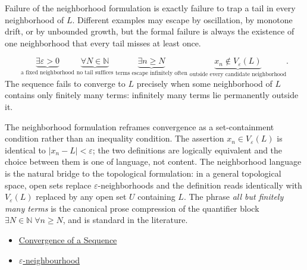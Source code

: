 \begin{remark*}
Failure of the neighborhood formulation is exactly failure to trap a
tail in every neighborhood of $L$. Different examples may escape by
oscillation, by monotone drift, or by unbounded growth, but the formal
failure is always the existence of one neighborhood that every tail
misses at least once.
\end{remark*}

\begin{remark*}
\[
\underbrace{\exists \varepsilon > 0}_{\text{a fixed neighborhood}}
\;\underbrace{\forall N \in \mathbb{N}}_{\text{no tail suffices}}
\;\underbrace{\exists n \ge N}_{\text{terms escape infinitely often}}
\;\underbrace{x_n \notin V_\varepsilon(L)}_{\text{outside every candidate neighborhood}}.
\]
The sequence fails to converge to $L$ precisely when some neighborhood
of $L$ contains only finitely many terms: infinitely many terms lie
permanently outside it.
\end{remark*}

\begin{remark*}[Interpretation]
The neighborhood formulation reframes convergence as a set-containment
condition rather than an inequality condition. The assertion $x_n \in
V_\varepsilon(L)$ is identical to $|x_n - L| < \varepsilon$; the two
definitions are logically equivalent and the choice between them is one
of language, not content. The neighborhood language is the natural
bridge to the topological formulation: in a general topological space,
open sets replace $\varepsilon$-neighborhoods and the definition reads
identically with $V_\varepsilon(L)$ replaced by any open set $U$
containing $L$. The phrase \emph{all but finitely many terms} is the
canonical prose compression of the quantifier block $\exists N \in
\mathbb{N} \;\forall n \ge N$, and is standard in the literature.
\end{remark*}

\begin{remark*}[Dependencies]
\begin{itemize}
  \item \hyperref[def:convergent-sequence]{Convergence of a Sequence}
  \item \hyperref[def:epsilon-neighbourhood]{$\varepsilon$-neighbourhood}
\end{itemize}
\end{remark*}











